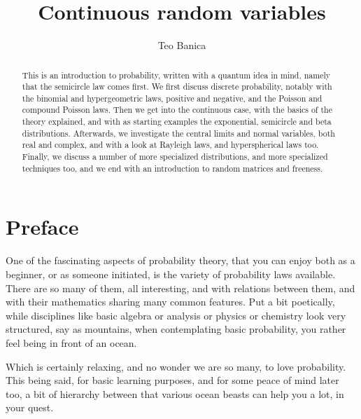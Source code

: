 \documentclass[12pt]{amsbook}
\begin{document}
\title{Continuous random variables}

\author{Teo Banica}
\address{Department of Mathematics, University of Cergy-Pontoise, F-95000 Cergy-Pontoise, France. {\tt teo.banica@gmail.com}}


\begin{abstract}
This is an introduction to probability, written with a quantum idea in mind, namely that the semicircle law comes first. We first discuss discrete probability, notably with the binomial and hypergeometric laws, positive and negative, and the Poisson and compound Poisson laws. Then we get into the continuous case, with the basics of the theory explained, and with as starting examples the exponential, semicircle and beta distributions. Afterwards, we investigate the central limits and normal variables, both real and complex, and with a look at Rayleigh laws, and hyperspherical laws too. Finally, we discuss a number of more specialized distributions, and more specialized techniques too, and we end with an introduction to random matrices and freeness.
\end{abstract}

\maketitle

\chapter*{Preface}

One of the fascinating aspects of probability theory, that you can enjoy both as a beginner, or as someone initiated, is the variety of probability laws available. There are so many of them, all interesting, and with relations between them, and with their mathematics sharing many common features. Put a bit poetically, while disciplines like basic algebra or analysis or physics or chemistry look very structured, say as mountains, when contemplating basic probability, you rather feel being in front of an ocean.

\bigskip

Which is certainly relaxing, and no wonder we are so many, to love probability. This being said, for basic learning purposes, and for some peace of mind later too, a bit of hierarchy between that various ocean beasts can help you a lot, in your quest.
\end{document}
